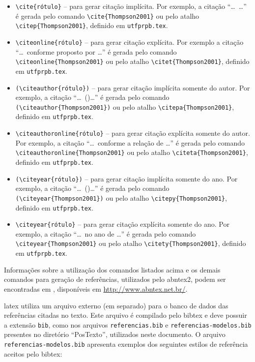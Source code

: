 \begin{itemize}%
    \item \verb|\cite{rótulo}| -- para gerar citação implícita. Por exemplo, a citação ``\ldots\ \cite{Thompson2001}\ldots'' é gerada pelo comando \verb|\cite{Thompson2001}| ou pelo atalho \verb|\citep{Thompson2001}|, definido em \texttt{utfprpb.tex}.
    \item \verb|\citeonline{rótulo}| -- para gerar citação explícita. Por exemplo a citação ``\ldots\ conforme proposto por \ldots'' é gerada pelo comando \verb|\citeonline{Thompson2001}| ou pelo atalho \verb|\citet{Thompson2001}|, definido em \texttt{utfprpb.tex}.
    \item \verb|(\citeauthor{rótulo})| -- para gerar citação implícita somente do autor. Por exemplo, a citação ``\ldots\ (\citeauthor{Thompson2001})\ldots'' é gerada pelo comando \verb|(\citeauthor{Thompson2001})| ou pelo atalho \verb|\citepa{Thompson2001}|, definido em \texttt{utfprpb.tex}.
    \item \verb|\citeauthoronline{rótulo}| -- para gerar citação explícita somente do autor. Por exemplo, a citação ``\ldots\ conforme a relação de \ldots'' é gerada pelo comando \verb|\citeauthoronline{Thompson2001}| ou pelo atalho \verb|\citeta{Thompson2001}|, definido em \texttt{utfprpb.tex}.
    \item \verb|(\citeyear{rótulo})| -- para gerar citação implícita somente do ano. Por exemplo, a citação ``\ldots\ (\citeyear{Thompson2001})\ldots'' é gerada pelo comando \verb|(\citeyear{Thompson2001})| ou pelo atalho \verb|\citepy{Thompson2001}|, definido em \texttt{utfprpb.tex}.
    \item \verb|\citeyear{rótulo}| -- para gerar citação explícita somente do ano. Por exemplo, a citação ``\ldots\ no ano de \citeyear{Thompson2001}\ldots'' é gerada pelo comando \verb|\citeyear{Thompson2001}| ou pelo atalho \verb|\citety{Thompson2001}|, definido em \texttt{utfprpb.tex}.
\end{itemize}

Informações sobre a utilização dos comandos listados acima e os demais comandos para geração de referências, utilizados pelo \gls{abntex2}, podem ser encontradas em , disponíveis em \url{http://www.abntex.net.br/}.

\gls{latex} utiliza um arquivo externo (em separado) para o banco de dados das referências citadas no texto. Este arquivo é compilado pelo \gls{bibtex} e deve possuir a extensão \texttt{bib}, como nos arquivos \texttt{referencias.bib} e \texttt{referencias-modelos.bib} presentes no diretório ``PosTexto'', utilizados neste documento. O arquivo \texttt{referencias-modelos.bib} apresenta exemplos dos seguintes estilos de referência aceitos pelo \gls{bibtex}:

